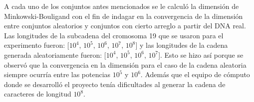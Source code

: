 \documentclass[letterpaper,12pt,oneside]{book}
\begin{document}
A cada uno de los conjuntos antes mencionados se le calculó la dimensión de Minkowski-Bouligand con el fin de indagar en la convergencia de la dimensión entre conjuntos aleatorios y conjuntos con cierto arreglo a partir del DNA real.
\\

Las longitudes de la subcadena del cromosoma 19 que se usaron para el experimento fueron: [$10^{4}$, $10^{5}$, $10^{6}$, $10^{7}$, $10^{8}$] y las longitudes de la cadena generada aleatoriamente fueron: [$10^{4}$, $10^{5}$, $10^{6}$, $10^{7}$]. Esto se hizo así porque se observó que la convergencia en la dimensión para el caso de la cadena aleatoria siempre ocurría entre las potencias $10^{5}$ y $10^{6}$. Además que el equipo de cómputo donde se desarrolló el proyecto tenía dificultades al generar la cadena de caracteres de longitud $10^{8}$.
\\


\end{document}
